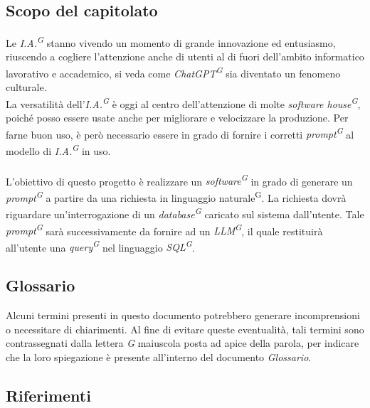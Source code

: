 \documentclass[5pt]{article}
\begin{document}
  \subsection{Scopo del capitolato}
    Le \textit{I.A.\textsuperscript{G}} stanno vivendo un momento di grande innovazione ed entusiasmo, 
    riuscendo a cogliere l'attenzione anche di utenti al di fuori dell'ambito informatico lavorativo e accademico, 
    si veda come \textit{ChatGPT\textsuperscript{G}} sia diventato un fenomeno culturale. \\
    La versatilità dell'\textit{I.A.\textsuperscript{G}} è oggi al centro dell'attenzione di molte \textit{software house\textsuperscript{G}}, 
    poiché posso essere usate anche per migliorare e velocizzare la produzione. 
    Per farne buon uso, è però necessario essere in grado di fornire i corretti \textit{prompt\textsuperscript{G}} al 
    modello di \textit{I.A.\textsuperscript{G}} in uso. \\\\
    L'obiettivo di questo progetto è realizzare un \textit{software\textsuperscript{G}} in grado di generare 
    un \textit{prompt\textsuperscript{G}} a partire da una richiesta in linguaggio naturale\textsuperscript{G}. La richiesta dovrà riguardare un'interrogazione 
    di un \textit{database\textsuperscript{G}} caricato sul sistema dall'utente. Tale \textit{prompt\textsuperscript{G}} sarà successivamente da fornire 
    ad un \textit{LLM\textsuperscript{G}}, il quale restituirà all'utente una \textit{query\textsuperscript{G}} nel linguaggio 
    \textit{SQL\textsuperscript{G}}.

  \subsection{Glossario}
    Alcuni termini presenti in questo documento potrebbero generare incomprensioni o necessitare di chiarimenti. 
    Al fine di evitare queste eventualità, tali termini sono contrassegnati dalla lettera \textit{G} maiuscola posta ad apice della parola, 
    per indicare che la loro spiegazione è presente all'interno del documento \textit{Glossario}.

  \subsection{Riferimenti}
\end{document}
